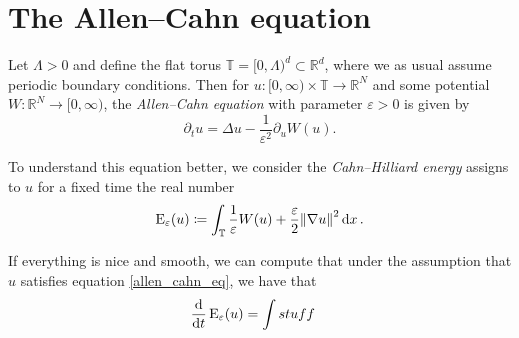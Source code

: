 \chapter{The Allen--Cahn equation}

Let $ \Lambda > 0 $ and define the flat torus 
$ \mathbb{T} = [0, \Lambda )^{ d } \subset \mathbb{ R }^{ d } $, 
where we as usual assume periodic boundary conditions. 
Then for 
$ u \colon [ 0 , \infty ) \times \mathbb{ T } \to \mathbb{ R }^{ N } $ 
and some potential 
$ W \colon \mathbb{ R }^{ N } \to [0, \infty ) $,
the \emph{Allen--Cahn equation} with parameter $ \varepsilon > 0 $ is given by
\begin{equation}
	\label{allen_cahn_eq}
	\partial_{ t } u 
	=
	\Delta u - \frac{1 }{ \varepsilon^{ 2 } } \partial_{ u } W ( u ).
\end{equation}

To understand this equation better, we consider the \emph{Cahn--Hilliard energy} assigns to $ u $ for a fixed time the real number
\begin{equation}
	\label{cahn_hilliard_energy}
	\operatorname{E}_{ \varepsilon } 
		(u)
	\coloneqq
	\int_{ \mathbb{ T } }
		\frac{ 1 }{ \varepsilon }
		W ( u )
		+
		\frac{ \varepsilon }{ 2 }
		\norm{ \nabla u }^{ 2 }
	\dd{x}.
\end{equation}

If everything is nice and smooth, we can compute that under the assumption that $ u $ satisfies 
equation \ref{allen_cahn_eq}, we have that
\begin{align*}
	\frac{ \dd }{ \dd{ t } } \operatorname{E}_{ \varepsilon } ( u )
	&=
	\int
	stuff
\end{align*}


